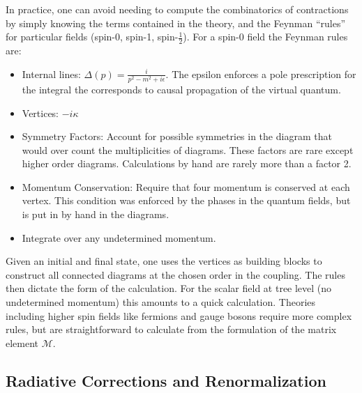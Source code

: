 In practice, one can avoid needing to compute the combinatorics of contractions by simply knowing 
the terms contained in the theory, and the Feynman ``rules'' for particular fields 
(spin-0, spin-1, spin-$\frac{1}{2}$). For a spin-0 field the Feynman rules are:
\begin{itemize}
\item Internal lines: $\Delta(p) = \frac{i}{p^2 - m^2+i\epsilon}$. The epsilon enforces a pole prescription for the integral the corresponds to causal propagation of the
virtual quantum. 
\item Vertices: $-i\kappa$
\item Symmetry Factors: Account for possible symmetries in the diagram that would over count the multiplicities of diagrams. These factors are rare except higher order diagrams. Calculations by hand are rarely more than a factor 2. 
\item Momentum Conservation: Require that four momentum is conserved at each vertex. This condition was enforced by the phases in the quantum fields, but is put in by hand in the diagrams.
\item Integrate over any undetermined momentum. 
\end{itemize}
Given an initial and final state, one uses the vertices as building blocks to construct all 
connected diagrams at the chosen order in the coupling. The rules then dictate the form of the calculation. For
the scalar field at tree level (no undetermined momentum) this amounts to a quick calculation. Theories 
including higher spin fields like fermions and gauge bosons require more complex rules, but are straightforward 
to calculate from the formulation of the matrix element $\mathcal{M}$.

\subsection{Radiative Corrections and Renormalization} 

